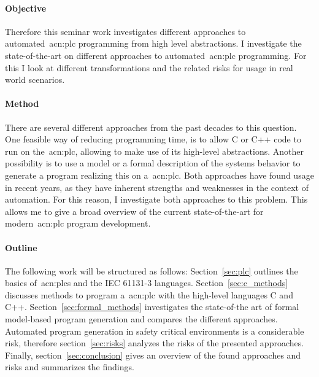 \paragraph{Objective}
Therefore this seminar work investigates different approaches to automated~\gls{acn:plc} programming from high level abstractions.
I investigate the state-of-the-art on different approaches to automated~\gls{acn:plc} programming.
For this I look at different transformations and the related risks for usage in real world scenarios.

\paragraph{Method}
There are several different approaches from the past decades to this question.
One feasible way of reducing programming time, is to allow C or C++ code to run on the~\gls{acn:plc}, allowing to make use of its high-level abstractions.
Another possibility is to use a model or a formal description of the systems behavior to generate a program realizing this on a~\gls{acn:plc}.
Both approaches have found usage in recent years, as they have inherent strengths and weaknesses in the context of automation.
For this reason, I investigate both approaches to this problem.
This allows me to give a broad overview of the current state-of-the-art for modern~\gls{acn:plc} program development.

\paragraph{Outline}
The following work will be structured as follows: 
Section~\ref{sec:plc} outlines the basics of~\glspl{acn:plc} and the IEC 61131-3 languages. 
Section~\ref{sec:c_methods} discusses methods to program a~\gls{acn:plc} with the high-level languages C and C++.
Section~\ref{sec:formal_methods} investigates the state-of-the art of formal model-based program generation and compares the different approaches.
Automated program generation in safety critical environments is a considerable risk, therefore section~\ref{sec:risks} analyzes the risks of the presented approaches.
Finally, section~\ref{sec:conclusion} gives an overview of the found approaches and risks and summarizes the findings.